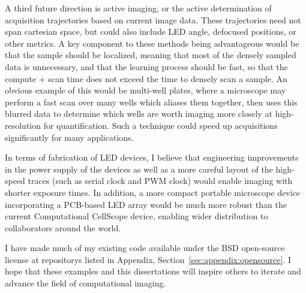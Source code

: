 A third future direction is active imaging, or the active determination of acquisition trajectories based on current image data. These trajectories need not span cartesian space, but could also include LED angle, defocused positions, or other metrics. A key component to these methods being advantageous would be that the sample should be localized, meaning that most of the densely sampled data is unnecessary, and that the learning process should be fast, so that the compute + scan time does not exceed the time to densely scan a sample. An obvious example of this would be multi-well plates, where a microscope may perform a fast scan over many wells which aliases them together, then uses this blurred data to determine which wells are worth imaging more closely at high-resolution for quantification. Such a technique could speed up acquisitions significantly for many applications.

In terms of fabrication of LED devices, I believe that engineering improvements in the power supply of the devices as well as a more careful layout of the high-speed traces (such as serial clock and PWM clock) would enable imaging with shorter exposure times. In addition, a more compact portable microscope device incorporating a PCB-based LED array would be much more robust than the current Computational CellScope device, enabling wider distribution to collaborators around the world.

I have made much of my existing code available under the BSD open-source license at repositorys listed in Appendix, Section~\ref{sec:appendix:opensource}. I hope that these examples and this dissertations will inspire others to iterate and advance the field of computational imaging.
